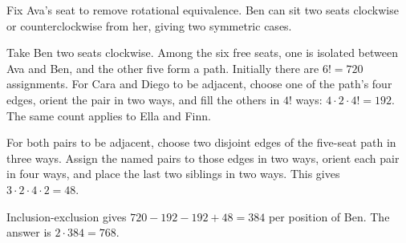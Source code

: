 Fix Ava's seat to remove rotational equivalence. Ben can sit two seats clockwise or counterclockwise from her, giving two symmetric cases.

Take Ben two seats clockwise. Among the six free seats, one is isolated between Ava and Ben, and the other five form a path. Initially there are $6!=720$ assignments. For Cara and Diego to be adjacent, choose one of the path's four edges, orient the pair in two ways, and fill the others in $4!$ ways: $4\cdot2\cdot4!=192$. The same count applies to Ella and Finn.

For both pairs to be adjacent, choose two disjoint edges of the five-seat path in three ways. Assign the named pairs to those edges in two ways, orient each pair in four ways, and place the last two siblings in two ways. This gives $3\cdot2\cdot4\cdot2=48$.

Inclusion-exclusion gives $720-192-192+48=384$ per position of Ben. The answer is $\boxed{2\cdot384=768}$.
